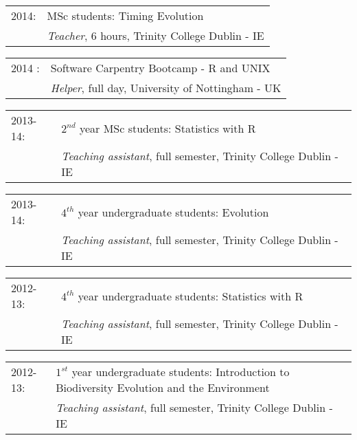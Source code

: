 \documentclass[10pt,a4paper]{article}
\begin{document}
{%
\begin{tabular}{ll}
2014: & MSc students: Timing Evolution \\
      & \textit{Teacher}, 6 hours, Trinity College Dublin - IE \\
\end{tabular}

\begin{tabular}{ll}
2014 : & Software Carpentry Bootcamp - R and UNIX \\
      & \textit{Helper}, full day, University of Nottingham - UK \\
\end{tabular}

\begin{tabular}{ll}
2013-14: & $2^{nd}$ year MSc students: Statistics with R \\
         & \textit{Teaching assistant}, full semester, Trinity College Dublin - IE \\
\end{tabular}

\begin{tabular}{ll}
2013-14: & $4^{th}$ year undergraduate students: Evolution\\
         & \textit{Teaching assistant}, full semester, Trinity College Dublin - IE\\
\end{tabular}

\begin{tabular}{ll}
2012-13: & $4^{th}$ year undergraduate students: Statistics with R\\
         & \textit{Teaching assistant}, full semester, Trinity College Dublin - IE\\
\end{tabular}

\begin{tabular}{ll}
2012-13: & $1^{st}$ year undergraduate students: Introduction to Biodiversity Evolution and the Environment\\
         & \textit{Teaching assistant}, full semester, Trinity College Dublin - IE\\
\end{tabular}


}
\end{document}
